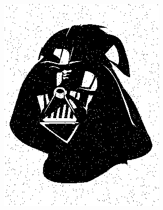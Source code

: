 \documentclass[]{article}
\begin{document}
\begin{section}
\begin{subsection}
\begin{figure}[h]
\begin{subfigure}{0.24\textwidth}
                \centering
                \includegraphics[width=\textwidth]{uncoded.png}
                \caption{}
                \label{fig:uncoded}
            \end{subfigure}
            \begin{subfigure}{0.24\textwidth}
                \centering

\end{subfigure}
\end{figure}
\end{subsection}
\end{section}
\end{document}
